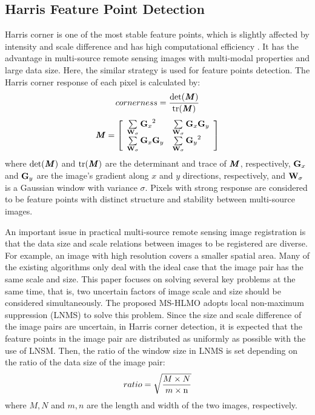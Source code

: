 \subsection{Harris Feature Point Detection}
\label{ssec:subhead}
Harris corner \cite{harris1988combined} is one of the most stable feature points, which is slightly affected by intensity and scale difference and has high computational efficiency \cite{gao2021multi,2021Multi}. It has the advantage in multi-source remote sensing images with multi-modal properties and large data size. Here, the similar strategy \cite{2021Multi} is used for feature points detection. The Harris corner response of each pixel is calculated by:
\begin{equation}
cornerness = \frac{{{\rm{det}}(\textbf{\emph{M}})}}{{{\rm{tr}}(\textbf{\emph{M}})}}
\end{equation}
\begin{equation}
\textbf{\emph{M}} = \left[ {\begin{array}{*{20}{l}}
{\sum\limits_{{\bf{W}_\sigma}} {{{\bf{G}}_x}^2} }&{\sum\limits_{{\bf{W}_\sigma}} {{{\bf{G}}_x} {{\bf{G}}_y}}}\\
{\sum\limits_{{\bf{W}_\sigma}} {{{\bf{G}}_x} {{\bf{G}}_y}} }&{\sum\limits_{{\bf{W}_\sigma}} {{{\bf{G}}_y}^2}}
\end{array}} \right]
\end{equation}
where $\rm{det}(\textbf{\emph{M}})$ and $\rm{tr}(\textbf{\emph{M}})$ are the determinant and trace of $\textbf{\emph{M}}$, respectively, ${{\bf{G}}_x}$ and ${{\bf{G}}_y}$ are the image's gradient along $x$ and $y$ directions, respectively, and $\bf{W}_\sigma$ is a Gaussian window with variance $\sigma$. Pixels with strong response are considered to be feature points with distinct structure and stability between multi-source images.

An important issue in practical multi-source remote sensing image registration is that the data size and scale relations between images to be registered are diverse. For example, an image with high resolution covers a smaller spatial area. Many of the existing algorithms only deal with the ideal case that the image pair has the same scale and size. This paper focuses on solving several key problems at the same time, that is, two uncertain factors of image scale and size should be considered simultaneously. The proposed MS-HLMO adopts local non-maximum suppression (LNMS) to solve this problem. Since the size and scale difference of the image pairs are uncertain, in Harris corner detection, it is expected that the feature points in the image pair are distributed as uniformly as possible with the use of LNSM. Then, the ratio of the window size in LNMS is set depending on the ratio of the data size of the image pair:
\begin{equation}
ratio = \sqrt {\frac{{M \times N}}{{m \times {\rm{n}}}}}
\end{equation}
where $M,N$ and $m,n$ are the length and width of the two images, respectively.

